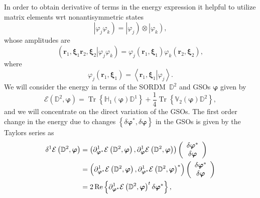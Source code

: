 \documentclass[aps,preprint]{revtex4}%
\begin{document}
In order to obtain derivative of terms in the energy expression it helpful to
utilize matrix elements wrt nonantisymmetric states
\begin{equation}
\left\vert \varphi_{j}\varphi_{k}\right)  =\left\vert \varphi_{j}\right)
\otimes\left\vert \varphi_{k}\right)  ,
\end{equation}
whose amplitudes are
\begin{equation}
\left(  \left.  \bm{r}_{1}\bm{,\xi}_{1}\bm{r}_{2}\bm{,\xi}_{2}\right\vert
\varphi_{j}\varphi_{k}\right)  =\varphi_{j}\left(  \bm{r}_{1}\bm{,\xi}_{1}%
\right)  \varphi_{k}\left(  \bm{r}_{2}\bm{,\xi}_{2}\right)  ,
\end{equation}
where
\begin{equation}
\varphi_{j}\left(  \bm{r}_{1}\bm{,\xi}_{1}\right)  =\left\langle \left.
\bm{r}_{1}\bm{,\xi}_{1}\right\vert \varphi_{j}\right\rangle .
\end{equation}
We will consider the energy in terms of the SORDM\ $\mathbb{D}^{2}$ and GSOs
$\bm{\varphi}$ given by
\begin{equation}
\mathcal{E}\left(  \mathbb{D}^{2},\bm{\varphi}\right)  =\operatorname{Tr}%
\left\{  \mathbb{H}_{1}\left(  \bm{\varphi}\right)  \mathbb{D}^{1}\right\}
+\frac{1}{4}\operatorname{Tr}\left\{  \mathbb{V}_{2}\left(
\bm{\varphi}\right)  \mathbb{D}^{2}\right\}  , \label{e1}%
\end{equation}
and we will concentrate on the direct variation of the GSOs. The first order
change in the energy due to changes $\left\{  \delta\bm{\varphi}^{\ast}%
,\delta\bm{\varphi}\right\}  $ in the GSOs is given by the Taylors series as
\begin{align}
\delta^{1}\mathcal{E}\left(  \mathbb{D}^{2},\bm{\varphi}\right)   &  =\left(
\partial_{\bm{\varphi}^{\ast}}^{1}\mathcal{E}\left(  \mathbb{D}^{2}%
,\bm{\varphi}\right)  ,\partial_{\bm{\varphi}}^{1}\mathcal{E}\left(
\mathbb{D}^{2},\bm{\varphi}\right)  \right)  \left(
\begin{array}
[c]{c}%
\delta\bm{\varphi}^{\ast}\\
\delta\bm{\varphi}
\end{array}
\right) \nonumber\\
&  =\left(  \partial_{\bm{\varphi}^{\ast}}^{1}\mathcal{E}\left(
\mathbb{D}^{2},\bm{\varphi}\right)  ,\partial_{\bm{\varphi}^{\ast}}%
^{1}\mathcal{E}\left(  \mathbb{D}^{2},\bm{\varphi}\right)  ^{\ast}\right)
\left(
\begin{array}
[c]{c}%
\delta\bm{\varphi}^{\ast}\\
\delta\bm{\varphi}
\end{array}
\right) \nonumber\\
&  =2\operatorname{Re}\left\{  \partial_{\bm{\varphi}^{\ast}}^{1}%
\mathcal{E}\left(  \mathbb{D}^{2},\bm{\varphi}\right)  ^{t}\delta
\bm{\varphi}^{\ast}\right\}  ,
\end{align}
\end{document}
